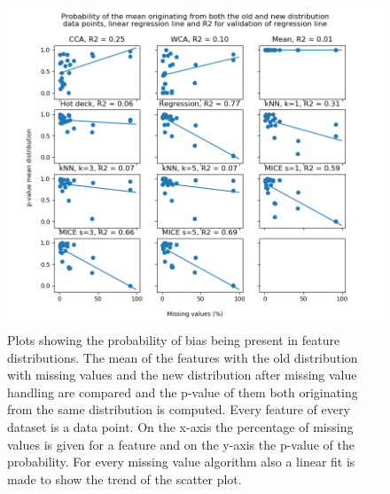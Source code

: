 \documentclass[10pt,a4paper]{report}
\begin{document}
	\begin{figure}[]
		\centering
		\includegraphics[width=\textwidth]{Mean_Dist.PNG}
		\caption{Plots showing the probability of bias being present in feature distributions. The mean of the features with the old distribution with missing values and the new distribution after missing value handling are compared and the p-value of them both originating from the same distribution is computed. Every feature of every dataset is a data point. On the x-axis the percentage of missing values is given for a feature and on the y-axis the p-value of the probability. For every missing value algorithm also a linear fit is made to show the trend of the scatter plot.}
		\label{fig:PMeanFits}
	\end{figure}
	
\end{document}

